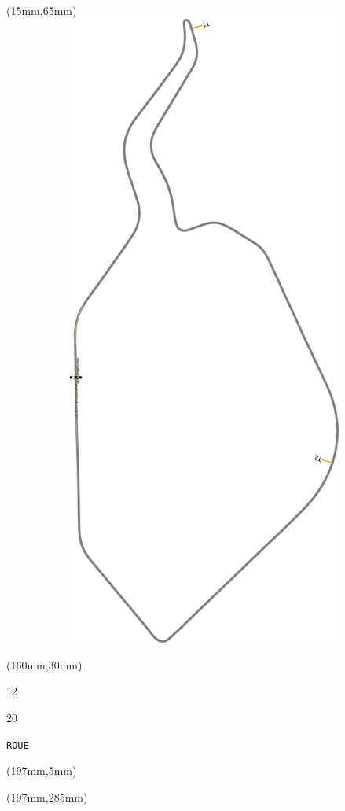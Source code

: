 \begin{textblock*}{185mm}(15mm,65mm)%
\centering
\mbox{\includegraphics[width=185mm,height=210mm,keepaspectratio]{PT/ROUE.pdf}}
\end{textblock*}
\begin{textblock*}{40mm}(160mm,30mm)%
\Large
\par{} 
\par12 
\par20 
\par\hfill\tiny\tt ROUE\\
\end{textblock*}
\begin{textblock*}{20mm}(197mm,5mm)%
\fbox{\thepage}
\label{ROUE}
\end{textblock*}
\begin{textblock*}{20mm}(197mm,285mm)%
\fbox{\thepage}
\end{textblock*}

